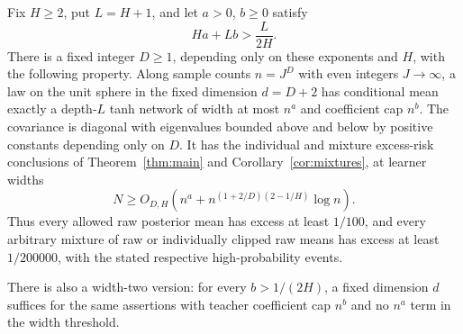 \begin{theorem}
\label{thm:fixed-sharp-range}
Fix $H\ge2$, put $L=H+1$, and let $a>0$, $b\ge0$ satisfy
\[
 Ha+Lb>\frac L{2H}.
\]
There is a fixed integer $D\ge1$, depending only on these exponents and $H$, with the following property. Along sample counts $n=J^D$ with even integers $J\to\infty$, a law on the unit sphere in the fixed dimension $d=D+2$ has conditional mean exactly a depth-$L$ tanh network of width at most $n^a$ and coefficient cap $n^b$. The covariance is diagonal with eigenvalues bounded above and below by positive constants depending only on $D$. It has the individual and mixture excess-risk conclusions of Theorem~\ref{thm:main} and Corollary~\ref{cor:mixtures}, at learner widths
\[
 N\ge O_{D,H}\left(n^a+n^{(1+2/D)(2-1/H)}\log n\right).
\]
Thus every allowed raw posterior mean has excess at least $1/100$, and every arbitrary mixture of raw or individually clipped raw means has excess at least $1/200000$, with the stated respective high-probability events.

There is also a width-two version: for every $b>1/(2H)$, a fixed dimension $d$ suffices for the same assertions with teacher coefficient cap $n^b$ and no $n^a$ term in the width threshold.
\end{theorem}
